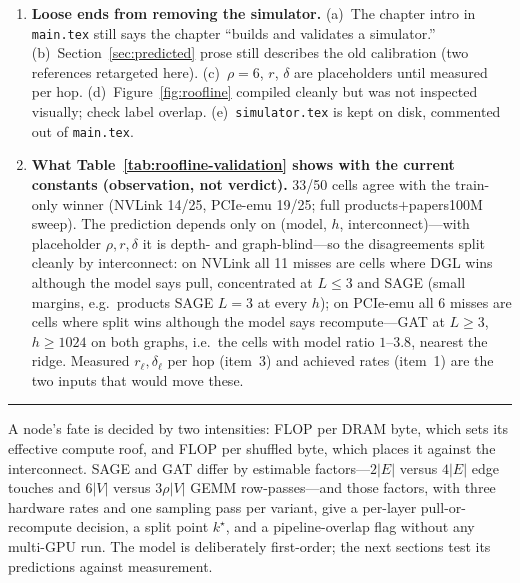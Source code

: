 {\begin{enumerate}
        $T^{\mathrm{net}}/T^{\mathrm{cmp}}\propto 1/h$ (wider $\Rightarrow$ more compute-bound
        $\Rightarrow$ toward split), while the measured gsplit-vs-DGL gap on PCIe-emu \emph{grows}
        with $h$ (products/SAGE $L{=}3$: $6.9\%\to23.8\%\to39.4\%$ for $h=256\to512\to1024$;
        $L{=}4$: $25.7\%\to55.6\%$). The explanation offered in Section~\ref{sec:roofline-scope}
        is sub-roof compute (linear in $h$) plus the $h$-independent fixed term; it needs one
        plot---measured $T^{\mathrm{net}}/T^{\mathrm{cmp}}$ vs.\ $h$ against the model line---to
        stand. Item~1 should make the model line come out right.
  \item \textbf{Loose ends from removing the simulator.} (a)~The chapter intro in \texttt{main.tex}
        still says the chapter ``builds and validates a simulator.'' (b)~Section~\ref{sec:predicted}
        prose still describes the old calibration (two references retargeted here).
        (c)~$\rho{=}6$, $r$, $\delta$ are placeholders until measured per hop.
        (d)~Figure~\ref{fig:roofline} compiled cleanly but was not inspected visually; check label
        overlap. (e)~\texttt{simulator.tex} is kept on disk, commented out of \texttt{main.tex}.
  \item \textbf{What Table~\ref{tab:roofline-validation} shows with the current constants
        (observation, not verdict).} 33/50 cells agree with the train-only winner (NVLink 14/25,
        PCIe-emu 19/25; full products$+$papers100M sweep). The prediction depends only on
        (model, $h$, interconnect)---with placeholder $\rho, r, \delta$ it is depth- and
        graph-blind---so the disagreements split cleanly by interconnect: on NVLink all 11 misses
        are cells where DGL wins although the model says pull, concentrated at $L\le 3$ and SAGE
        (small margins, e.g.\ products SAGE $L{=}3$ at every $h$); on PCIe-emu all 6 misses are
        cells where split wins although the model says recompute---GAT at $L\ge 3$, $h\ge 1024$ on
        both graphs, i.e.\ the cells with model ratio $1$--$3.8$, nearest the ridge. Measured
        $r_\ell,\delta_\ell$ per hop (item~3) and achieved rates (item~1) are the two inputs that
        would move these.
\end{enumerate}
}
\noindent\rule{\linewidth}{0.8pt}

A node's fate is decided by two intensities: FLOP per DRAM byte, which sets its effective
compute roof, and FLOP per shuffled byte, which places it against the interconnect. SAGE and
GAT differ by estimable factors---$2|E|$ versus $4|E|$ edge touches and $6|V|$ versus
$3\rho|V|$ GEMM row-passes---and those factors, with three hardware rates and one sampling
pass per variant, give a per-layer pull-or-recompute decision, a split point $k^\star$, and a
pipeline-overlap flag without any multi-GPU run. The model is deliberately first-order; the
next sections test its predictions against measurement.
